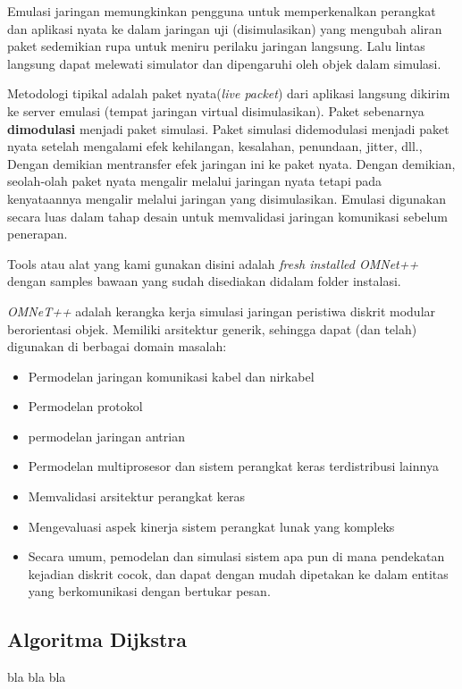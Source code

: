 \documentclass[conference]{IEEEtran}
\begin{document}
Emulasi jaringan memungkinkan pengguna untuk memperkenalkan perangkat dan aplikasi nyata ke dalam jaringan uji (disimulasikan) yang mengubah aliran paket sedemikian rupa untuk meniru perilaku jaringan langsung. Lalu lintas langsung dapat melewati simulator dan dipengaruhi oleh objek dalam simulasi.

Metodologi tipikal adalah paket nyata(\textit{live packet}) dari aplikasi langsung dikirim ke server emulasi (tempat jaringan virtual disimulasikan). Paket sebenarnya \textbf{dimodulasi} menjadi paket simulasi. Paket simulasi didemodulasi menjadi paket nyata setelah mengalami efek kehilangan, kesalahan, penundaan, jitter, dll., Dengan demikian mentransfer efek jaringan ini ke paket nyata. Dengan demikian, seolah-olah paket nyata mengalir melalui jaringan nyata tetapi pada kenyataannya mengalir melalui jaringan yang disimulasikan. Emulasi digunakan secara luas dalam tahap desain untuk memvalidasi jaringan komunikasi sebelum penerapan.

Tools atau alat yang kami gunakan disini adalah \textit{fresh installed OMNet++} dengan samples bawaan yang sudah disediakan didalam folder instalasi.

\textit{OMNeT++} adalah kerangka kerja simulasi jaringan peristiwa diskrit modular berorientasi objek. Memiliki arsitektur generik, sehingga dapat (dan telah) digunakan di berbagai domain masalah:

\begin{itemize}
  \item Permodelan jaringan komunikasi kabel dan nirkabel
  \item Permodelan protokol
  \item permodelan jaringan antrian
  \item Permodelan multiprosesor dan sistem perangkat keras terdistribusi lainnya
  \item Memvalidasi arsitektur perangkat keras
  \item Mengevaluasi aspek kinerja sistem perangkat lunak yang kompleks
  \item Secara umum, pemodelan dan simulasi sistem apa pun di mana pendekatan kejadian diskrit cocok, dan dapat dengan mudah dipetakan ke dalam entitas yang berkomunikasi dengan bertukar pesan.
\end{itemize}

\subsection{Algoritma Dijkstra}
bla bla bla
\end{document}
